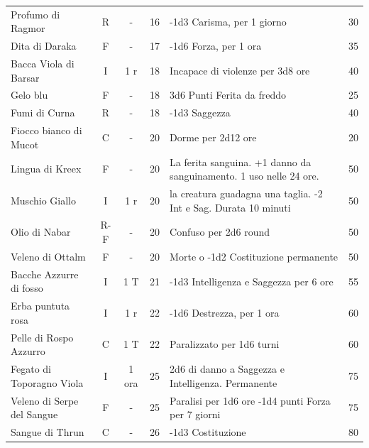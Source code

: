 \begin{tabularx}{\linewidth}{lcccXc}
 \rowcolor{gray!20}Profumo di Ragmor \index{Profumo di Ragmor}& R& - & 16& -1d3 Carisma, per 1 giorno & 30\\

	Dita di Daraka\index{Dita di Daraka} & F& - & 17& -1d6 Forza, per 1 ora & 35\\

 \rowcolor{gray!20}Bacca Viola di Barsar\index{Bacca Viola di Barsar}& I& 1 r& 18& Incapace di violenze per 3d8 ore& 40 \\

	Gelo blu \index{Gelo blu} & F& -& 18& 3d6 Punti Ferita da freddo& 25\\

 \rowcolor{gray!20}Fumi di Curna\index{Fumi di Curna} & R& - & 18& -1d3 Saggezza & 40\\

	Fiocco bianco di Mucot \index{Fiocco bianco di Mucot}& C& - & 20& Dorme per 2d12 ore& 20\\

 \rowcolor{gray!20}Lingua di Kreex \index{Lingua di Kreex} & F& - & 20& La ferita sanguina. +1 danno da sanguinamento. 1 uso nelle 24 ore. & 50 \\

	Muschio Giallo \index{Muschio Giallo}& I& 1 r& 20& la creatura guadagna una taglia. -2 Int e Sag. Durata 10 minuti& 50\\

 \rowcolor{gray!20}Olio di Nabar \index{Olio di Nabar}& R-F& - & 20& Confuso per 2d6 round& 50\\

	Veleno di Ottalm\index{Veleno di Ottalm}& F& - & 20& Morte o -1d2 Costituzione permanente& 50\\

 \rowcolor{gray!20}Bacche Azzurre di fosso \index{Bacche Azzurre di fosso}& I& 1 T& 21& -1d3 Intelligenza e Saggezza per 6 ore& 55\\

	Erba puntuta rosa \index{Erba puntuta rosa}& I& 1 r& 22& -1d6 Destrezza, per 1 ora& 60\\

 \rowcolor{gray!20}Pelle di Rospo Azzurro \index{Pelle di Rospo Azzurro}& C& 1 T & 22& Paralizzato per 1d6 turni& 60\\

	Fegato di Toporagno Viola \index{Fegato di Toporagno Viola} & I& 1 ora& 25& 2d6 di danno a Saggezza e Intelligenza. Permanente & 75 \\

 \rowcolor{gray!20}Veleno di Serpe del Sangue \index{Veleno di Serpe del Sangue} & F& - & 25& Paralisi per 1d6 ore -1d4 punti Forza per 7 giorni & 75\\

	Sangue di Thrun \index{Sangue di Thrun} & C& - & 26& -1d3 Costituzione & 80\\

\end{tabularx}

